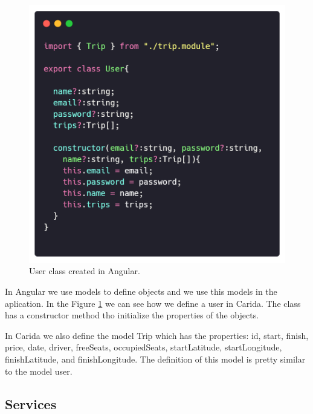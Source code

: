 \documentclass{article}
\begin{document}
  \begin{figure}[h]
    \centering
    \includegraphics[width=0.8\columnwidth]{figures/user.module.ts.png}
    \caption{User class created in Angular.\label{fig:user.module.ts}}
    \end{figure}
    
    In Angular we use models to define objects and we use this models in the aplication. In the Figure \ref{fig:user.module.ts} we can see how we define a user in Carida. The class has a constructor method tho initialize the properties of the objects.

    In Carida we also define the model Trip which has the properties: id, start, finish, price, date, driver, freeSeats, occupiedSeats, startLatitude, startLongitude, finishLatitude, and finishLongitude. The definition of this model is pretty similar to the model user.

    
    \subsection*{Services}
\end{document}
